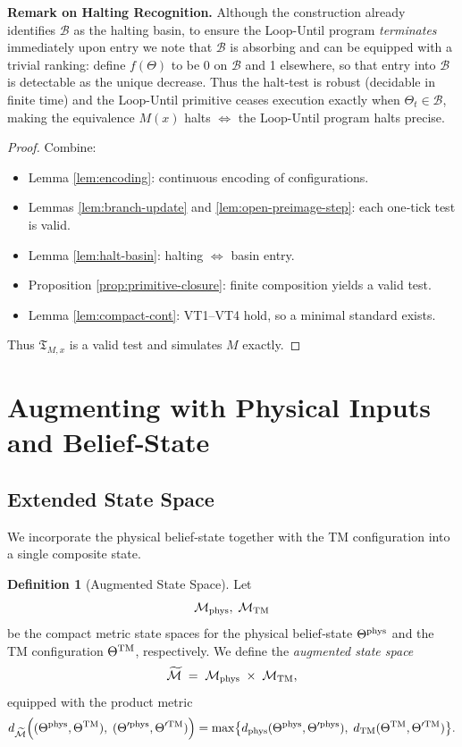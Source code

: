 \documentclass[12pt]{article}
\theoremstyle{definition}
\newtheorem{definition}{Definition}[section]
\theoremstyle{plain}
\begin{document}
\noindent\textbf{Remark on Halting Recognition.}  
Although the construction already identifies \(\mathcal B\) as the halting basin, to ensure the Loop-Until program \emph{terminates} immediately upon entry we note that \(\mathcal B\) is absorbing and can be equipped with a trivial ranking: define \(f(\Theta)\) to be 0 on \(\mathcal B\) and 1 elsewhere, so that entry into \(\mathcal B\) is detectable as the unique decrease.  Thus the halt-test is robust (decidable in finite time) and the Loop-Until primitive ceases execution exactly when \(\Theta_t\in\mathcal B\), making the equivalence \(M(x)\) halts \(\iff\) the Loop-Until program halts precise.  


\begin{proof}
Combine:
\begin{itemize}
  \item Lemma \ref{lem:encoding}: continuous encoding of configurations.
  \item Lemmas \ref{lem:branch-update} and \ref{lem:open-preimage-step}: each one‑tick test is valid.
  \item Lemma \ref{lem:halt-basin}: halting \(\iff\) basin entry.
  \item Proposition \ref{prop:primitive-closure}: finite composition yields a valid test.
  \item Lemma \ref{lem:compact-cont}: VT1–VT4 hold, so a minimal standard exists.
\end{itemize}
Thus \(\mathfrak T_{M,x}\) is a valid test and simulates \(M\) exactly.
\end{proof}


\section{Augmenting with Physical Inputs and Belief‐State}
\subsection{Extended State Space}
\label{subsec:augmented-state-space}

We incorporate the physical belief‑state together with the TM configuration into a single composite state.

\begin{definition}[Augmented State Space]
Let
\[
  \mathcal M_{\rm phys},\;\mathcal M_{\rm TM}
\]
be the compact metric state spaces for the physical belief‑state \(\Theta^{\rm phys}\) and the TM configuration \(\Theta^{\rm TM}\), respectively.  We define the \emph{augmented state space}
\[
  \widetilde{\mathcal M}
  \;=\;
  \mathcal M_{\rm phys} \;\times\; \mathcal M_{\rm TM},
\]
equipped with the product metric
\[
  d_{\widetilde{\mathcal M}}
  \Bigl((\Theta^{\rm phys},\Theta^{\rm TM}),\;(\Theta'^{\rm phys},\Theta'^{\rm TM})\Bigr)
  =\max\bigl\{d_{\rm phys}(\Theta^{\rm phys},\Theta'^{\rm phys}),\;d_{\rm TM}(\Theta^{\rm TM},\Theta'^{\rm TM})\bigr\}.
\]
\end{definition}
\end{document}
